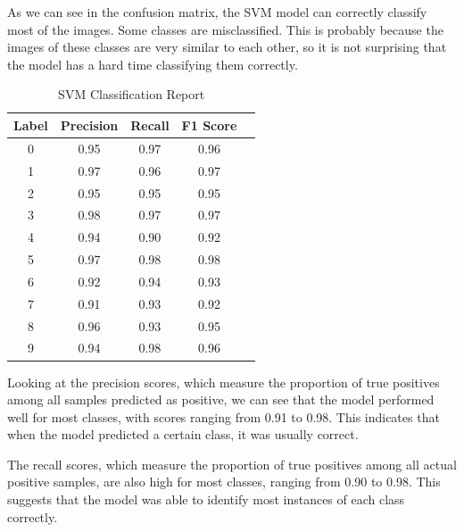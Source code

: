 \documentclass[conference]{IEEEtran}
\begin{document}
As we can see in the confusion matrix, the SVM model can correctly classify most of the images. 
Some classes are misclassified. This is probably because the images of these classes are very similar to each other, so it is not surprising that the model has a hard time classifying them correctly.
\begin{table}[!h]
    \centering
    \begin{tabular}{|c|c|c|c|r|}
        \hline
        \textbf{Label} & \textbf{Precision} & \textbf{Recall} &  \textbf{F1 Score} \\ \hline
        0              & 0.95               & 0.97            & 0.96               \\ \hline
        1              & 0.97               & 0.96            & 0.97               \\ \hline
        2              & 0.95               & 0.95            & 0.95               \\ \hline
        3              & 0.98               & 0.97            & 0.97               \\ \hline
        4              & 0.94               & 0.90            & 0.92               \\ \hline
        5              & 0.97               & 0.98            & 0.98               \\ \hline
        6              & 0.92               & 0.94            & 0.93               \\ \hline
        7              & 0.91               & 0.93            & 0.92               \\ \hline
        8              & 0.96               & 0.93            & 0.95               \\ \hline
        9              & 0.94               & 0.98            & 0.96               \\ \hline
    \end{tabular}
    \caption{SVM Classification Report \label{tab:svm_classification_report}}
\end{table}
Looking at the precision scores, which measure the proportion of true positives among all samples predicted as positive, we can see that the model performed well for most classes, with scores ranging from 0.91 to 0.98. This indicates that when the model predicted a certain class, it was usually correct.

The recall scores, which measure the proportion of true positives among all actual positive samples, are also high for most classes, ranging from 0.90 to 0.98. This suggests that the model was able to identify most instances of each class correctly.
\end{document}
